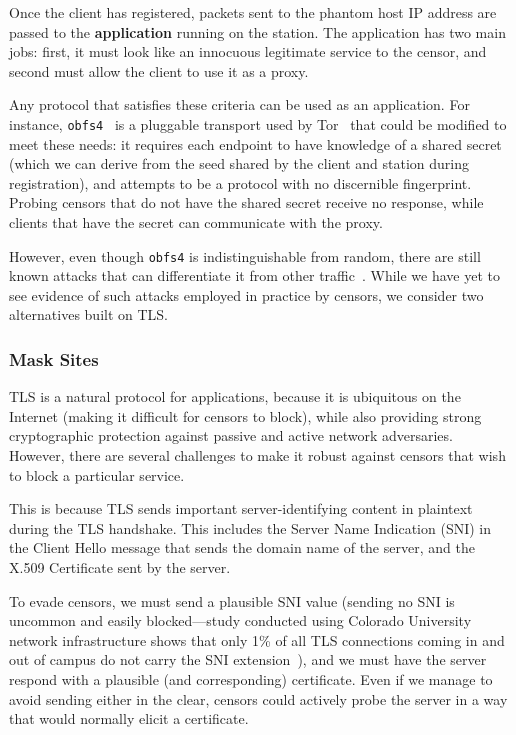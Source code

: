 \documentclass[letterpaper,twocolumn,10pt]{article}
\begin{document}
Once the client has registered, packets sent to the phantom host IP address are
passed to the \textbf{application} running on the station. The application has
two main jobs: first, it must look like an innocuous legitimate service to the
censor, and second must allow the client to use it as a proxy.

Any protocol that satisfies these criteria can be used as an application. For
instance, \texttt{obfs4}~\cite{obfs4} is a pluggable transport used by
Tor~\cite{tor} that could be
modified to meet these needs: it requires each endpoint to have knowledge of a
shared secret (which we can derive from the seed shared by the client and
station during registration), and attempts to be a protocol with no discernible
fingerprint. Probing censors that do not have the shared secret receive no
response, while clients that have the secret can communicate with the proxy.

However, even though \texttt{obfs4} is indistinguishable from random, there are
still known attacks that can differentiate it from other
traffic~\cite{wang2015seeing}. While we have yet to see evidence of such attacks
employed in practice by censors, we consider two alternatives built on TLS.


\FigOverview

\subsubsection{Mask Sites}

TLS is a natural protocol for \scheme applications, because it is ubiquitous on
the Internet (making it difficult for censors to block), while also providing
strong cryptographic protection against passive and active network adversaries.
However, there are several challenges to make it robust against censors that
wish to block a particular service.

This is because TLS sends important server-identifying content in plaintext
during the TLS handshake. This includes the Server Name Indication (SNI) in the
Client Hello message that sends the domain name of the server, and the
X.509 Certificate sent by the server.

To evade censors, we must send a plausible SNI value (sending no SNI is
uncommon and easily blocked---study conducted using Colorado University network
infrastructure shows that only 1\% of all TLS connections coming in and out of 
campus do not carry the
SNI extension~\cite{tls-fingerprint}), and we must have the server respond with
a plausible (and corresponding) certificate. Even if we manage to avoid sending
either in the clear, censors could actively probe the server in a
way that would normally elicit a certificate.
\end{document}
